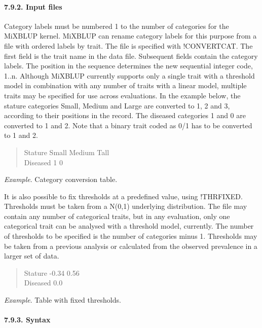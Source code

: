 \paragraph{7.9.2. Input files}\label{Stat43}

Category labels must be numbered 1 to the number of categories for the
MiXBLUP kernel. MiXBLUP can rename category labels for this purpose from
a file with ordered labels by trait. The file is specified with
!CONVERTCAT. The first field is the trait name in the data file.
Subsequent fields contain the category labels. The position in the
sequence determines the new sequential integer code, 1..n. Although
MiXBLUP currently supports only a single trait with a threshold model in
combination with any number of traits with a linear model, multiple
traits may be specified for use across evaluations. In the example
below, the stature categories Small, Medium and Large are converted to
1, 2 and 3, according to their positions in the record. The diseased
categories 1 and 0 are converted to 1 and 2. Note that a binary trait
coded as 0/1 has to be converted to 1 and 2.

\begin{quote}
Stature Small Medium Tall\\
Diseased 1 0
\end{quote}

\emph{Example}. Category conversion table.

It is also possible to fix thresholds at a predefined value, using
!THRFIXED. Thresholds must be taken from a N(0,1) underlying
distribution. The file may contain any number of categorical traits, but
in any evaluation, only one categorical trait can be analysed with a
threshold model, currently. The number of thresholds to be specified is
the number of categories minus 1. Thresholds may be taken from a
previous analysis or calculated from the observed prevalence in a larger
set of data.

\begin{quote}
Stature -0.34 0.56\\
Diseased 0.0
\end{quote}

\emph{Example}. Table with fixed thresholds.

\paragraph{7.9.3. Syntax}\label{Stat44}

